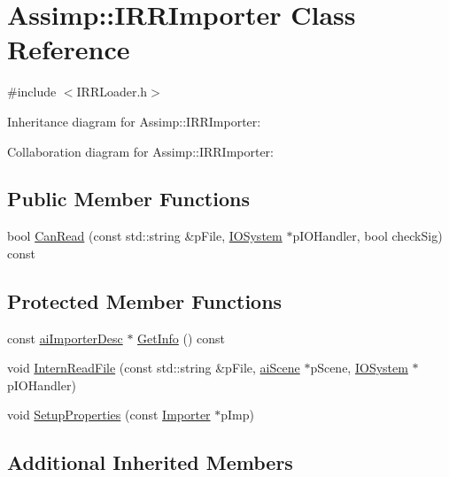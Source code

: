 \hypertarget{class_assimp_1_1_i_r_r_importer}{\section{Assimp\+:\+:I\+R\+R\+Importer Class Reference}
\label{class_assimp_1_1_i_r_r_importer}
}


{\ttfamily \#include $<$I\+R\+R\+Loader.\+h$>$}



Inheritance diagram for Assimp\+:\+:I\+R\+R\+Importer\+:


Collaboration diagram for Assimp\+:\+:I\+R\+R\+Importer\+:
\subsection*{Public Member Functions}
\begin{DoxyCompactItemize}
\item 
bool \hyperlink{class_assimp_1_1_i_r_r_importer_a21f3c3225dcbb256de854aa82c2b0d14}{Can\+Read} (const std\+::string \&p\+File, \hyperlink{class_assimp_1_1_i_o_system}{I\+O\+System} $\ast$p\+I\+O\+Handler, bool check\+Sig) const 
\end{DoxyCompactItemize}
\subsection*{Protected Member Functions}
\begin{DoxyCompactItemize}
\item 
const \hyperlink{structai_importer_desc}{ai\+Importer\+Desc} $\ast$ \hyperlink{class_assimp_1_1_i_r_r_importer_a331d6ddf0bf40b8138c0bea0056501a0}{Get\+Info} () const 
\item 
void \hyperlink{class_assimp_1_1_i_r_r_importer_adad165810aa7d7859ebe688bd27aa39f}{Intern\+Read\+File} (const std\+::string \&p\+File, \hyperlink{structai_scene}{ai\+Scene} $\ast$p\+Scene, \hyperlink{class_assimp_1_1_i_o_system}{I\+O\+System} $\ast$p\+I\+O\+Handler)
\item 
void \hyperlink{class_assimp_1_1_i_r_r_importer_af7f79b288d02fba72959b34f547e1766}{Setup\+Properties} (const \hyperlink{class_assimp_1_1_importer}{Importer} $\ast$p\+Imp)
\end{DoxyCompactItemize}
\subsection*{Additional Inherited Members}


